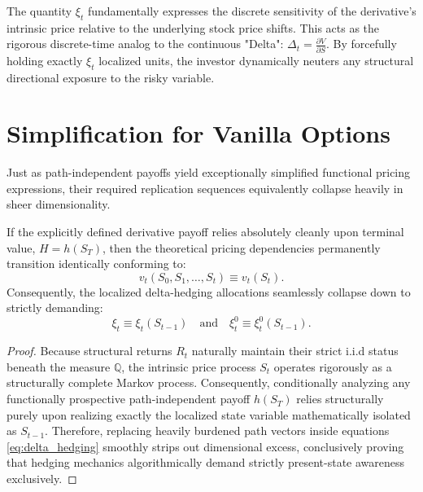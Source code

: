 The quantity $\xi_t$ fundamentally expresses the discrete sensitivity of the derivative's intrinsic price relative to the underlying stock price shifts. This acts as the rigorous discrete-time analog to the continuous "Delta": $\Delta_t = \frac{\partial V}{\partial S}$. By forcefully holding exactly $\xi_t$ localized units, the investor dynamically neuters any structural directional exposure to the risky variable.

\section{Simplification for Vanilla Options}

Just as path-independent payoffs yield exceptionally simplified functional pricing expressions, their required replication sequences equivalently collapse heavily in sheer dimensionality.

\begin{proposition}
    If the explicitly defined derivative payoff relies absolutely cleanly upon terminal value, $H = h(S_T)$, then the theoretical pricing dependencies permanently transition identically conforming to:
    \begin{equation}
        v_t(S_0, S_1, \dots, S_t) \equiv v_t(S_t).
    \end{equation}
    Consequently, the localized delta-hedging allocations seamlessly collapse down to strictly demanding:
    \begin{equation}
        \xi_t \equiv \xi_t(S_{t-1}) \quad \text{and} \quad \xi_t^0 \equiv \xi_t^0(S_{t-1}).
    \end{equation}
\end{proposition}

\begin{proof}
    Because structural returns $R_t$ naturally maintain their strict i.i.d status beneath the measure $\mathbb{Q}$, the intrinsic price process $S_t$ operates rigorously as a structurally complete Markov process. Consequently, conditionally analyzing any functionally prospective path-independent payoff $h(S_T)$ relies structurally purely upon realizing exactly the localized state variable mathematically isolated as $S_{t-1}$. Therefore, replacing heavily burdened path vectors inside equations \eqref{eq:delta_hedging} smoothly strips out dimensional excess, conclusively proving that hedging mechanics algorithmically demand strictly present-state awareness exclusively.
\end{proof}
